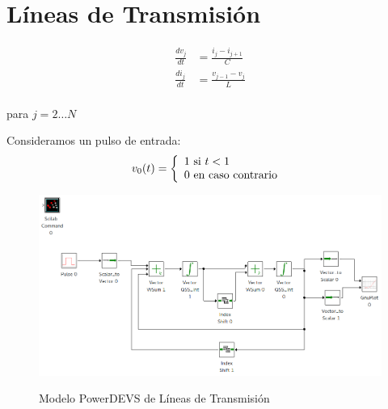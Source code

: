 \documentclass{beamer}
\begin{document}
\section{Líneas de Transmisión}
\begin{frame}
\begin{equation}
\begin{split}
\frac{d v_{j}}{d t} &= \frac{i_{j} - i_{j+1}}{C} \\
\frac{d i_{j}}{d t} &= \frac{v_{j-1} - v_{j}}{L} \\	
\end{split}
\end{equation}

para $j = 2 \dots N$

Consideramos un pulso de entrada:
\begin{equation}
v_0(t) = \left\{ 
  \begin{array}{l l}
    1 \text{ si } t < 1 \\
    0 \text{ en caso contrario }
  \end{array} \right.
\end{equation}
\end{frame}

\begin{frame}
\begin{figure}[H]
 \includegraphics[width=0.75\linewidth]{lclines}
\label{model:lclines}
\caption{Modelo PowerDEVS de Líneas de Transmisión}
\end{figure}
\end{frame}
\end{document}
